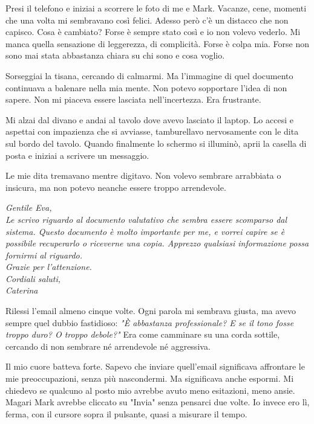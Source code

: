 Presi il telefono e iniziai a scorrere le foto di me e Mark. Vacanze, cene, momenti che una volta mi sembravano così felici. Adesso però c'è un distacco che non capisco. Cosa è cambiato? Forse è sempre stato così e io non volevo vederlo. Mi manca quella sensazione di leggerezza, di complicità. Forse è colpa mia. Forse non sono mai stata abbastanza chiara su chi sono e cosa voglio.

Sorseggiai la tisana, cercando di calmarmi. Ma l'immagine di quel documento continuava a balenare nella mia mente. Non potevo sopportare l'idea di non sapere. Non mi piaceva essere lasciata nell'incertezza. Era frustrante.

Mi alzai dal divano e andai al tavolo dove avevo lasciato il laptop. Lo accesi e aspettai con impazienza che si avviasse, tamburellavo nervosamente con le dita sul bordo del tavolo. Quando finalmente lo schermo si illuminò, aprii la casella di posta e iniziai a scrivere un messaggio.

Le mie dita tremavano mentre digitavo. Non volevo sembrare arrabbiata o insicura, ma non potevo neanche essere troppo arrendevole. 

\begin{tcolorbox}[colback=white!95!blue!5, colframe=blue!75!black, title=\textbf{Email di Caterina a Eva}, fonttitle=\bfseries]
\emph{Gentile Eva,\\
Le scrivo riguardo al documento valutativo che sembra essere scomparso dal sistema. Questo documento è molto importante per me, e vorrei capire se è possibile recuperarlo o riceverne una copia. Apprezzo qualsiasi informazione  possa fornirmi al riguardo.\\
Grazie per l'attenzione.\\
Cordiali saluti,\\
Caterina}
\end{tcolorbox}


Rilessi l'email almeno cinque volte. Ogni parola mi sembrava giusta, ma avevo sempre quel dubbio fastidioso: \emph{"È abbastanza professionale? E se il tono fosse troppo duro? O troppo debole?"} Era come camminare su una corda sottile, cercando di non sembrare né arrendevole né aggressiva.

Il mio cuore batteva forte. Sapevo che inviare quell'email significava affrontare le mie preoccupazioni, senza più nascondermi. Ma significava anche espormi. Mi chiedevo se qualcuno al posto mio avrebbe avuto meno esitazioni, meno ansie. Magari Mark avrebbe cliccato su "Invia" senza pensarci due volte. Io invece ero lì, ferma, con il cursore sopra il pulsante, quasi a misurare il tempo.

